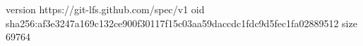 version https://git-lfs.github.com/spec/v1
oid sha256:af3e3247a169c132ce900f30117f15c03aa59daccdc1fdc9d5fec1fa02889512
size 69764
